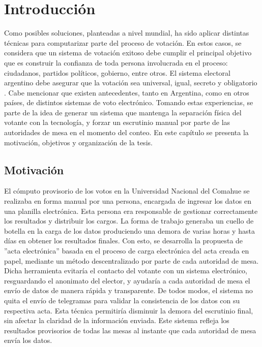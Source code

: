 \label{Introduccion}
\chapter{Introducción}
Como posibles soluciones, planteadas a nivel mundial, ha sido aplicar distintas técnicas para computarizar parte del proceso de votación. En estos casos, se considera que un sistema de votación exitoso debe cumplir el principal objetivo que es construir la confianza de toda persona involucrada en el proceso: ciudadanos, partidos políticos, gobierno, entre otros. El sistema electoral argentino debe asegurar que la votación sea universal, igual, secreto y obligatorio \citep{votoprimeravez}. Cabe mencionar que existen antecedentes, tanto en Argentina, como en  otros  países,  de  distintos  sistemas  de  voto  electrónico. Tomando estas experiencias, se parte de la idea de generar un sistema que mantenga la separación física del votante con la tecnología, y forzar un escrutinio manual por parte de las autoridades de mesa en el momento del conteo. \newline
En este capítulo se presenta la motivación, objetivos y organización de la tesis.

\section{Motivación}
El cómputo provisorio de los votos en la Universidad Nacional del Comahue se realizaba en forma manual por una persona, encargada de ingresar los datos en una planilla electrónica. Esta persona era responsable de gestionar correctamente los resultados y distribuir los cargos. La forma de trabajo generaba un cuello de botella en la carga de los datos produciendo una demora de varias horas y hasta días en obtener los resultados finales. \newline
Con esto, se desarrolla la propuesta de ''acta electrónica'' basada en el proceso de carga electrónica del acta creada en papel, mediante un método descentralizado  por parte de cada autoridad de mesa. Dicha herramienta evitaría el contacto del votante con un sistema electrónico, resguardando el anonimato del elector, y ayudaría a cada autoridad de mesa el envío de datos de manera rápida y transparente. De todos modos, el sistema no quita el envío de telegramas para validar la consistencia de los datos con su respectiva acta. Esta técnica permitiría disminuir la demora del escrutinio final, sin afectar la claridad de la información enviada. Este sistema refleja los resultados provisorios de todas las mesas al instante que cada autoridad de mesa envía los datos.

